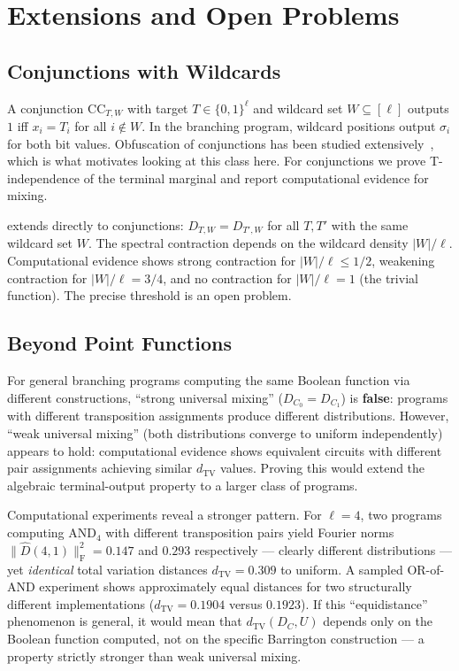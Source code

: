 \documentclass[version=final]{iacrcc}
\newcommand{\norm}[1]{\lVert #1 \rVert}
\newcommand{\frob}[1]{\norm{#1}_{\mathrm{F}}}
\newcommand{\dtv}{d_{\mathrm{TV}}}
\newcommand{\Dhat}{\widehat{D}}
\newcommand{\CC}{\mathrm{CC}}
\begin{document}
\section{Extensions and Open Problems}
\label{sec:extensions}

\subsection{Conjunctions with Wildcards}

A conjunction $\CC_{T,W}$ with target $T \in \{0,1\}^\ell$ and wildcard set
$W \subseteq [\ell]$ outputs $1$ iff $x_i = T_i$ for all $i \notin W$.
In the branching program, wildcard positions output $\sigma_i$ for both
bit values.  Obfuscation of conjunctions has been studied
extensively~\cite{BVWW16,BKMPRS18,BLMZ19}, which is what motivates looking at
this class here. For conjunctions we prove T-independence of the terminal
marginal and report computational evidence for mixing.

 extends directly to conjunctions:
$D_{T,W} = D_{T',W}$ for all $T, T'$ with the same wildcard set $W$.
The spectral contraction depends on the wildcard density $|W|/\ell$.
Computational evidence shows strong contraction for $|W|/\ell \leq 1/2$,
weakening contraction for $|W|/\ell = 3/4$, and no contraction for $|W|/\ell = 1$
(the trivial function). The precise threshold is an open problem.


\subsection{Beyond Point Functions}

For general branching programs computing the same Boolean function via
different constructions, ``strong universal mixing'' ($D_{C_0} = D_{C_1}$)
is \textbf{false}: programs with different transposition assignments produce
different distributions. However, ``weak universal mixing'' (both distributions
converge to uniform independently) appears to hold: computational evidence shows
equivalent circuits with different pair assignments achieving similar $\dtv$
values. Proving this would extend the algebraic terminal-output property to a
larger class of programs.

Computational experiments reveal a stronger pattern.  For $\ell = 4$, two
programs computing $\mathrm{AND}_4$ with different transposition pairs
yield Fourier norms $\frob{\Dhat(4,1)}^2 = 0.147$ and $0.293$
respectively --- clearly different distributions --- yet \emph{identical}
total variation distances $\dtv = 0.309$ to uniform.  A sampled OR-of-AND
experiment shows approximately equal distances for two structurally different
implementations ($\dtv=0.1904$ versus $0.1923$). If this ``equidistance''
phenomenon is general,
it would mean that $\dtv(D_C, U)$ depends only on the Boolean function
computed, not on the specific Barrington construction --- a property
strictly stronger than weak universal mixing.
\end{document}
